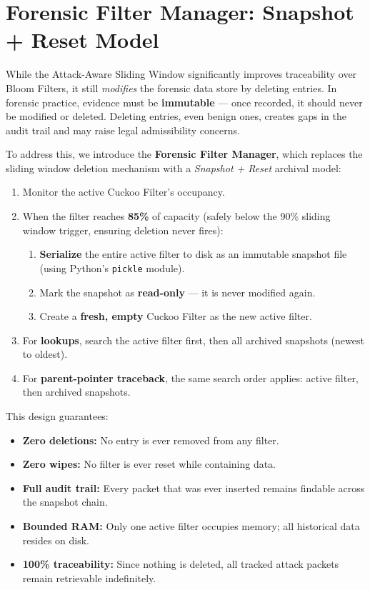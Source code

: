 \documentclass[12pt, a4paper]{report}
\begin{document}
\section{Forensic Filter Manager: Snapshot + Reset Model}
\label{sec:forensic-manager}

While the Attack-Aware Sliding Window significantly improves traceability
over Bloom Filters, it still \textit{modifies} the forensic data store by
deleting entries. In forensic practice, evidence must be
\textbf{immutable} --- once recorded, it should never be modified or
deleted. Deleting entries, even benign ones, creates gaps in the audit
trail and may raise legal admissibility concerns.

To address this, we introduce the \textbf{Forensic Filter Manager}, which
replaces the sliding window deletion mechanism with a
\textit{Snapshot + Reset} archival model:

\begin{enumerate}[leftmargin=*, label=\textbf{Step \arabic*:}]
  \item Monitor the active Cuckoo Filter's occupancy.
  \item When the filter reaches \textbf{85\%} of capacity (safely below
  the 90\% sliding window trigger, ensuring deletion never fires):
  \begin{enumerate}[label=(\alph*)]
    \item \textbf{Serialize} the entire active filter to disk as an
    immutable snapshot file (using Python's \texttt{pickle} module).
    \item Mark the snapshot as \textbf{read-only} --- it is never modified
    again.
    \item Create a \textbf{fresh, empty} Cuckoo Filter as the new active
    filter.
  \end{enumerate}
  \item For \textbf{lookups}, search the active filter first, then all
  archived snapshots (newest to oldest).
  \item For \textbf{parent-pointer traceback}, the same search order
  applies: active filter, then archived snapshots.
\end{enumerate}

This design guarantees:

\begin{itemize}[leftmargin=*]
  \item \textbf{Zero deletions:} No entry is ever removed from any filter.
  \item \textbf{Zero wipes:} No filter is ever reset while containing data.
  \item \textbf{Full audit trail:} Every packet that was ever inserted
  remains findable across the snapshot chain.
  \item \textbf{Bounded RAM:} Only one active filter occupies memory; all
  historical data resides on disk.
  \item \textbf{100\% traceability:} Since nothing is deleted, all tracked
  attack packets remain retrievable indefinitely.
\end{itemize}
\end{document}
